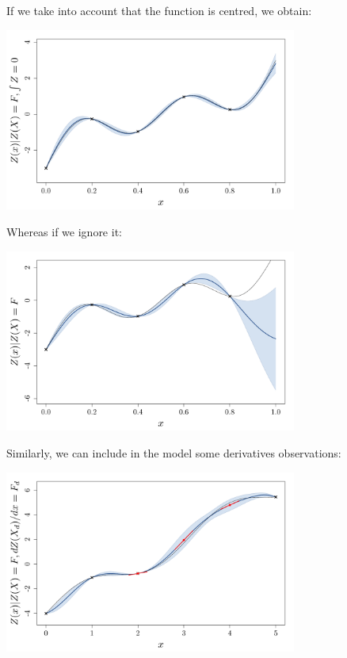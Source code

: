 \begin{frame}{}
\begin{example}
	If we take into account that the function is centred, we obtain:
	\begin{center}
	\includegraphics[height=6cm]{3_gaussian_process_regression/figures/R/exotic_int}
	\end{center}
\end{example}
\end{frame}

\begin{frame}{}
\begin{example}
	Whereas if we ignore it:
	\begin{center}
	\includegraphics[height=6cm]{3_gaussian_process_regression/figures/R/exotic_pasint}
	\end{center}
\end{example}
\end{frame}

\begin{frame}{}
Similarly, we can include in the model some derivatives observations:
	\begin{center}
	\includegraphics[height=6cm]{3_gaussian_process_regression/figures/R/exotic_der}
	\end{center}
\end{frame}

